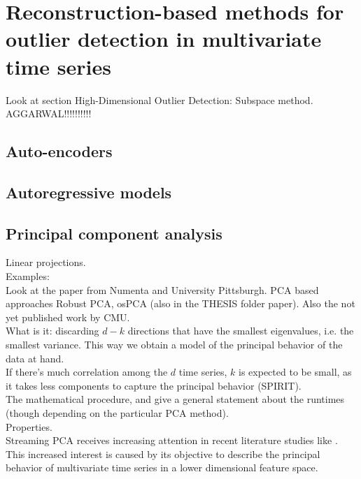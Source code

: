 



\section{Reconstruction-based methods for outlier detection in multivariate time series}

Look at section High-Dimensional Outlier Detection: Subspace method. AGGARWAL!!!!!!!!!!


\subsection{Auto-encoders}


\subsection{Autoregressive models}


\subsection{Principal component analysis}

Linear projections.\\

Examples:\\
Look at the paper from Numenta and University Pittsburgh.
PCA based approaches Robust PCA, osPCA (also in the THESIS folder paper).
Also the not yet published work by CMU.\\


What is it: discarding $d - k$ directions that have the smallest eigenvalues, i.e. the smallest variance. This way we obtain a model of the principal behavior of the data at hand.\\

If there's much correlation among the $d$ time series, $k$ is expected to be small, as it takes less components to capture the principal behavior (SPIRIT). \\

The mathematical procedure, and give a general statement about the runtimes (though depending on the particular PCA method).\\

Properties.\\
Streaming PCA receives increasing attention in recent literature studies like \cite{balzano2018streaming}. This increased interest is caused by its objective to describe the principal behavior of multivariate time series in a lower dimensional feature space. \\


